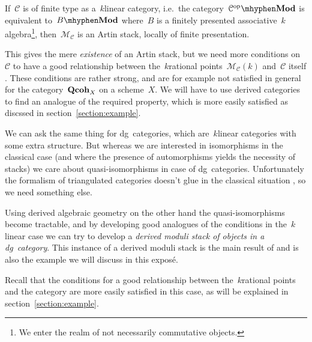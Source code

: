 \begin{refsection}
\begin{example}
  If~$\mathcal{C}$ is of finite type as a~$k$\dash linear category, i.e.\ the category~$\mathcal{C}^\opp\mhyphen\Mod$ is equivalent to~$B\mhyphen\Mod$ where~$B$ is a finitely presented associative~$k$\dash algebra\footnote{We enter the realm of not necessarily commutative objects.}, then~$\mathcal{M}_{\mathcal{C}}$ is an Artin stack, locally of finite presentation.

  This gives the mere \emph{existence} of an Artin stack, but we need more conditions on~$\mathcal{C}$ to have a good relationship between the~$k$\dash rational points~$\mathcal{M}_{\mathcal{C}}(k)$ and~$\mathcal{C}$ itself \cite[remark 1.2]{toen-vaquie}. These conditions are rather strong, and are for example not satisfied in general for the category~$\mathbf{Qcoh}_X$ on a scheme~$X$. We will have to use derived categories to find an analogue of the required property, which is more easily satisfied as discssed in section~\ref{section:example}.
\end{example}

\begin{remark}
  We can ask the same thing for dg~categories, which are~$k$\dash linear categories with some extra structure. But whereas we are interested in isomorphisms in the classical case (and where the presence of automorphisms yields the necessity of stacks) we care about quasi-isomorphisms in case of dg~categories. Unfortunately the formalism of triangulated categories doesn't glue in the classical situation \cite[example 4 in section 2.2]{lnm2008-toen}, so we need something else.

  Using derived algebraic geometry on the other hand the quasi-isomorphisms become tractable, and by developing good analogues of the conditions in the~$k$\dash linear case we can try to develop a \emph{derived moduli stack of objects in a dg~category}. This instance of a derived moduli stack is the main result of \cite{toen-vaquie} and is also the example we will discuss in this expos\'e.
  
  Recall that the conditions for a good relationship between the~$k$\dash rational points and the category are more easily satisfied in this case, as will be explained in section~\ref{section:example}.
\end{remark}


\end{refsection}
